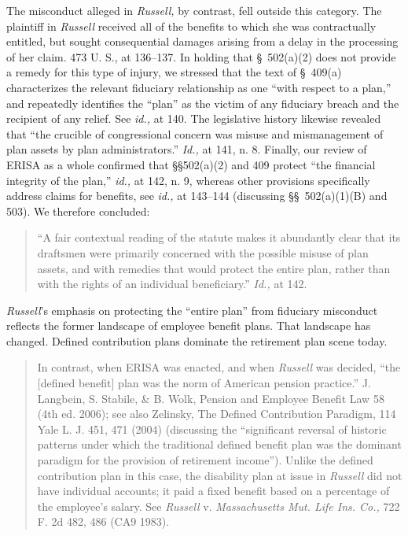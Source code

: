{  The misconduct alleged in \emph{Russell,} by contrast, fell outside this category. The plaintiff in \emph{Russell} received all of the benefits to which she was contractually entitled, but sought consequential damages arising from a delay in the processing of her claim. 473 U. S., at 136--137. In holding that \S~502(a)(2) does not provide a remedy for this type of injury, we stressed that the text of \S~409(a) characterizes the relevant fiduciary relationship as one ``with respect to a plan,'' and repeatedly identifies the ``plan'' as the victim of any fiduciary breach and the recipient of any relief. See \emph{id.,} at 140. The legislative history likewise revealed that ``the crucible of congressional concern was misuse and mismanagement of plan assets by plan administrators.'' \emph{Id.,} at 141, n. 8. Finally, our review of ERISA as a whole confirmed that \S\S502(a)(2) and 409 protect ``the financial integrity of the plan,'' \emph{id.,} at 142, n. 9, whereas other provisions specifically address claims for benefits, see \emph{id.,} at 143--144 (discussing \S\S~502(a)(1)(B) and 503). We therefore concluded:

    \begin{quote}

		``A fair contextual reading of the statute makes it abundantly clear that its draftsmen were primarily concerned with the possible misuse of plan assets, and with remedies that would protect the entire plan, rather than with the rights of an individual beneficiary.'' \emph{Id.,} at 142.

    \end{quote}

  \emph{Russell}'s emphasis on protecting the ``entire plan'' from fiduciary misconduct reflects the former landscape of employee benefit plans. That landscape has changed. \newpage  Defined contribution plans dominate the retirement plan scene today.\footnotemark[5]

      \begin{quote}

		  In contrast, when ERISA was enacted, and when \emph{Russell} was decided, ``the [defined benefit] plan was the norm of American pension practice.'' J. Langbein, S. Stabile, \& B. Wolk, Pension and Employee Benefit Law 58 (4th ed. 2006); see also Zelinsky, The Defined Contribution Paradigm, 114 Yale L. J. 451, 471 (2004) (discussing the ``significant reversal of historic patterns under which the traditional defined benefit plan was the dominant paradigm for the provision of retirement income''). Unlike the defined contribution plan in this case, the disability plan at issue in \emph{Russell} did not have individual accounts; it paid a fixed benefit based on a percentage of the employee's salary. See \emph{Russell} v. \emph{Massachusetts Mut. Life Ins. Co.,} 722 F. 2d 482, 486 (CA9 1983).


\end{quote}}
